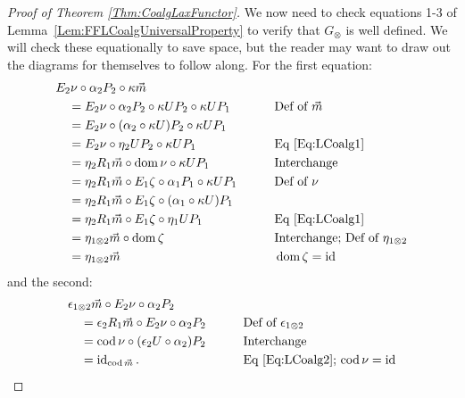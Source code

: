 \begin{proof}[Proof of Theorem \ref{Thm:CoalgLaxFunctor}]
	We now need to check equations 1-3 of Lemma~\ref{Lem:FFLCoalgUniversalProperty} to verify that $G_{\otimes}$ is well defined. We will check these equationally to save space, but the reader may want to draw out the diagrams for themselves to follow along. For the first equation:
	\begin{alignat*}{2}
		\hspace{1em}&\hspace{-1em} E_2\nu \circ \alpha_2P_2 \circ \kappa\vec{m} && \\
		&= E_2\nu \circ \alpha_2P_2 \circ \kappa UP_2 \circ \kappa UP_1 
			&& \text{Def of $\vec{m}$} \\
		&= E_2\nu \circ (\alpha_2\circ\kappa U)P_2 \circ \kappa UP_1 && \\
		&= E_2\nu \circ \eta_2UP_2 \circ \kappa UP_1 
			&& \text{Eq \eqref{Eq:LCoalg1}} \\
		&= \eta_2R_1\vec{m} \circ \operatorname{dom}\nu \circ \kappa UP_1 
			&& \text{Interchange} \\
		&= \eta_2R_1\vec{m} \circ E_1\zeta \circ \alpha_1P_1 \circ \kappa UP_1 
			&\qquad& \text{Def of $\nu$} \\
		&= \eta_2R_1\vec{m} \circ E_1\zeta \circ (\alpha_1\circ\kappa U)P_1 && \\
		&= \eta_2R_1\vec{m} \circ E_1\zeta \circ \eta_1UP_1 
			&&\text{Eq \eqref{Eq:LCoalg1}} \\
		&= \eta_{1\otimes 2}\vec{m} \circ \operatorname{dom}\zeta 
			&&\text{Interchange; Def of $\eta_{1\otimes 2}$} \\
		&= \eta_{1\otimes 2}\vec{m} 
			&&\operatorname{dom}\zeta=\operatorname{id}
	\end{alignat*}
	and the second:
	\begin{alignat*}{2}
		\hspace{1em}&\hspace{-1em} \epsilon_{1\otimes 2}\vec{m} \circ E_2\nu \circ \alpha_2P_2 && \\
		&= \epsilon_2R_1\vec{m} \circ E_2\nu \circ \alpha_2P_2  
			&& \text{Def of $\epsilon_{1\otimes2}$} \\
		&= \operatorname{cod}\nu \circ (\epsilon_2U\circ\alpha_2)P_2 
			&\qquad& \text{Interchange} \\
		&= \operatorname{id}_{\operatorname{cod}\vec{m}}. 
			&&\text{Eq \eqref{Eq:LCoalg2}; $\operatorname{cod}\nu=\operatorname{id}$}
	\end{alignat*}


\end{proof}
